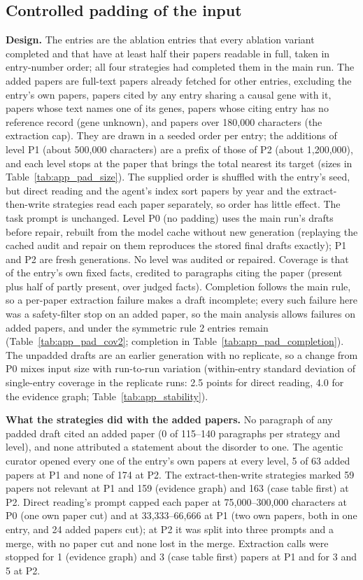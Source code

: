 \documentclass{article} %
\begin{document}
\FloatBarrier
\subsection{Controlled padding of the input}
\label{app:r2_pad}
\textbf{Design.} The entries are the ablation entries that every ablation variant completed and that have at least half their papers readable in full, taken in entry-number order; all four strategies had completed them in the main run. The added papers are full-text papers already fetched for other entries, excluding the entry's own papers, papers cited by any entry sharing a causal gene with it, papers whose text names one of its genes, papers whose citing entry has no reference record (gene unknown), and papers over 180,000 characters (the extraction cap). They are drawn in a seeded order per entry; the additions of level P1 (about 500,000 characters) are a prefix of those of P2 (about 1,200,000), and each level stops at the paper that brings the total nearest its target (sizes in Table~\ref{tab:app_pad_size}). The supplied order is shuffled with the entry's seed, but direct reading and the agent's index sort papers by year and the extract-then-write strategies read each paper separately, so order has little effect. The task prompt is unchanged. Level P0 (no padding) uses the main run's drafts before repair, rebuilt from the model cache without new generation (replaying the cached audit and repair on them reproduces the stored final drafts exactly); P1 and P2 are fresh generations. No level was audited or repaired. Coverage is that of the entry's own fixed facts, credited to paragraphs citing the paper (present plus half of partly present, over judged facts). Completion follows the main rule, so a per-paper extraction failure makes a draft incomplete; every such failure here was a safety-filter stop on an added paper, so the main analysis allows failures on added papers, and under the symmetric rule 2 entries remain (Table~\ref{tab:app_pad_cov2}; completion in Table~\ref{tab:app_pad_completion}). The unpadded drafts are an earlier generation with no replicate, so a change from P0 mixes input size with run-to-run variation (within-entry standard deviation of single-entry coverage in the replicate runs: 2.5 points for direct reading, 4.0 for the evidence graph; Table~\ref{tab:app_stability}).

\textbf{What the strategies did with the added papers.} No paragraph of any padded draft cited an added paper (0 of 115--140 paragraphs per strategy and level), and none attributed a statement about the disorder to one. The agentic curator opened every one of the entry's own papers at every level, 5 of 63 added papers at P1 and none of 174 at P2. The extract-then-write strategies marked 59 papers not relevant at P1 and 159 (evidence graph) and 163 (case table first) at P2. Direct reading's prompt capped each paper at 75,000--300,000 characters at P0 (one own paper cut) and at 33,333--66,666 at P1 (two own papers, both in one entry, and 24 added papers cut); at P2 it was split into three prompts and a merge, with no paper cut and none lost in the merge. Extraction calls were stopped for 1 (evidence graph) and 3 (case table first) papers at P1 and for 3 and 5 at P2.
\end{document}
